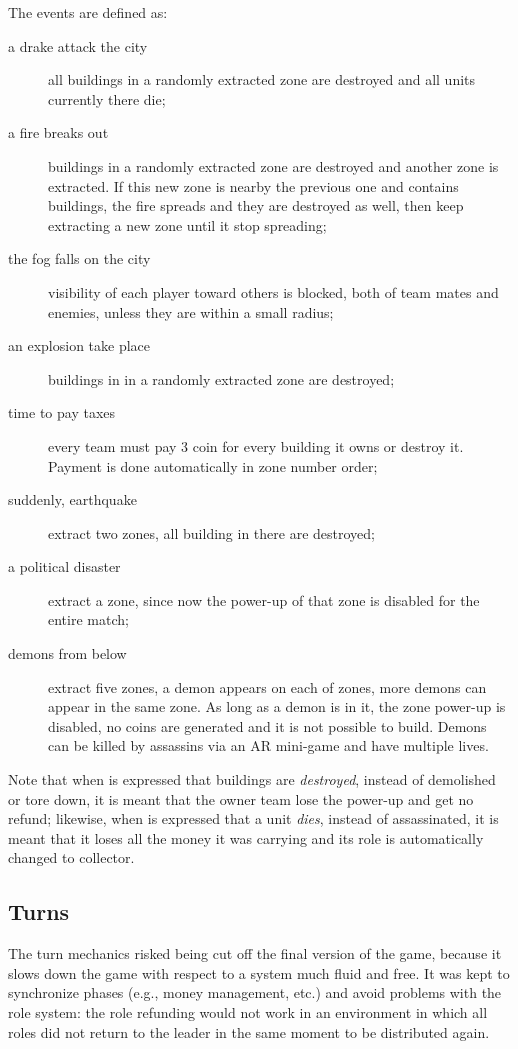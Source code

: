 			The events are defined as:
			\begin{description}
				\item[a drake attack the city] all buildings in a randomly extracted zone are destroyed and all units currently there die;
				\item[a fire breaks out] buildings in a randomly extracted zone are destroyed and another zone is extracted. If this new zone is nearby the previous one and contains buildings, the fire spreads and they are destroyed as well, then keep extracting a new zone until it stop spreading;
				\item[the fog falls on the city] visibility of each player toward others is blocked, both of team mates and enemies, unless they are within a small radius;
				\item[an explosion take place] buildings in in a randomly extracted zone are destroyed;
				\item[time to pay taxes] every team must pay 3 coin for every building it owns or destroy it. Payment is done automatically in zone number order;
				\item[suddenly, earthquake] extract two zones, all building in there are destroyed;
				\item[a political disaster] extract a zone, since now the power-up of that zone is disabled for the entire match;
				\item[demons from below] extract five zones, a demon appears on each of zones, more demons can appear in the same zone. As long as a demon is in it, the zone power-up is disabled, no coins are generated and it is not possible to build. Demons can be killed by assassins via an AR mini-game and have multiple lives.
			\end{description}
			
			Note that when is expressed that buildings are \emph{destroyed}, instead of demolished or tore down, it is meant that the owner team lose the power-up and get no refund; likewise, when is expressed that a unit \emph{dies}, instead of assassinated, it is meant that it loses all the money it was carrying and its role is automatically changed to collector.
			
			
		\subsection{Turns}
		
			The turn mechanics risked being cut off the final version of the game, because it slows down the game with respect to a system much fluid and free.
			It was kept to synchronize phases (e.g., money management, etc.) and avoid problems with the role system: the role refunding would not work in an environment in which all roles did not return to the leader in the same moment to be distributed again.
			
